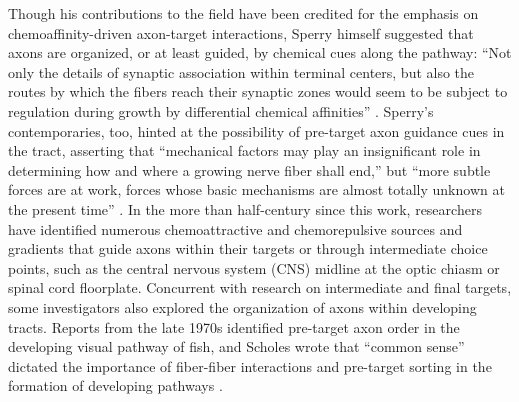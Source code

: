 Though his contributions to the field have been credited for the emphasis on chemoaffinity-driven axon-target interactions, Sperry himself suggested that axons are organized, or at least guided, by chemical cues along the pathway: “Not only the details of synaptic association within terminal centers, but also the routes by which the fibers reach their synaptic zones would seem to be subject to regulation during growth by differential chemical affinities” \cite{attardi1963preferential}.
Sperry’s contemporaries, too, hinted at the possibility of pre-target axon guidance cues in the tract, asserting that “mechanical factors may play an insignificant role in determining how and where a growing nerve fiber shall end,” but “more subtle forces are at work, forces whose basic mechanisms are almost totally unknown at the present time” \cite{barnard1956study}.
In the more than half-century since this work, researchers have identified numerous chemoattractive and chemorepulsive sources and gradients that guide axons within their targets or through intermediate choice points, such as the central nervous system (CNS) midline at the optic chiasm or spinal cord floorplate. 
Concurrent with research on intermediate and final targets, some investigators also explored the organization of axons within developing tracts.
Reports from the late 1970s identified pre-target axon order in the developing visual pathway of fish, and Scholes wrote that “common sense” dictated the importance of fiber-fiber interactions and pre-target sorting in the formation of developing pathways \cite{cook1977multiple,scholes1979nerve}.